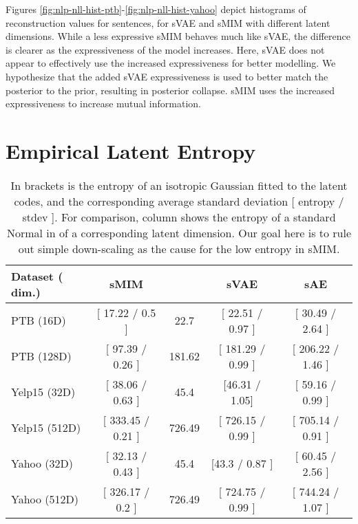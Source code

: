 \documentclass{article}
\begin{document}
Figures \ref{fig:nlp-nll-hist-ptb}-\ref{fig:nlp-nll-hist-yahoo} depict histograms of reconstruction values for sentences, for sVAE and sMIM with different latent dimensions.
While a less expressive sMIM behaves much like sVAE, the difference is clearer as the expressiveness of the model increases. 
Here, sVAE does not appear to effectively use the increased expressiveness for better modelling.
We hypothesize that the added sVAE expressiveness is used to better match the posterior 
to the prior, resulting in posterior collapse. sMIM uses the increased expressiveness to 
increase mutual information.

\FloatBarrier

\section{Empirical Latent Entropy} 

\begin{table}[t]
    \centering
    \setlength{\tabcolsep}{0.2em} {\scriptsize
    \renewcommand{\arraystretch}{1.2}\begin{tabular}{l||cccc}
        Dataset ( dim.) & sMIM &  & sVAE & sAE   \\ \hline \hline
        PTB (16D) & [ 17.22 / 0.5 ] & 22.7 &  [ 22.51 / 0.97 ] &  [ 30.49 / 2.64 ]  \\
        PTB (128D) &  [ 97.39 / 0.26 ] & 181.62 & [ 181.29 / 0.99 ] & [ 206.22 / 1.46 ] \\
        \hline
        Yelp15 (32D) & [ 38.06 / 0.63 ] & 45.4 &  [46.31 / 1.05] & [ 59.16 / 0.99 ]  \\
        Yelp15 (512D) &  [ 333.45 / 0.21 ] & 726.49  & [ 726.15 / 0.99 ] & [ 705.14 / 0.91 ] \\
        \hline
        Yahoo (32D) &  [ 32.13 / 0.43 ] & 45.4 & [43.3 / 0.87 ] & [ 60.45 / 2.56 ]  \\
        Yahoo (512D) &  [ 326.17 / 0.2 ] & 726.49  &  [ 724.75 / 0.99 ] & [ 744.24 / 1.07 ] \\
        \end{tabular}
    }
    \vspace*{-0.1cm}
    \caption{
    In brackets is the entropy of an isotropic Gaussian fitted to the latent codes, and the corresponding average standard deviation [ entropy / stdev ].
    For comparison, column  shows the entropy of a standard Normal in  of a corresponding latent dimension.
    Our goal here is to rule out simple down-scaling as the cause for the low entropy in sMIM.
}
    \label{tab:language-modelling-quantitative-entropy-fitted}
    \vspace*{-0.1cm}
\end{table}
\end{document}
